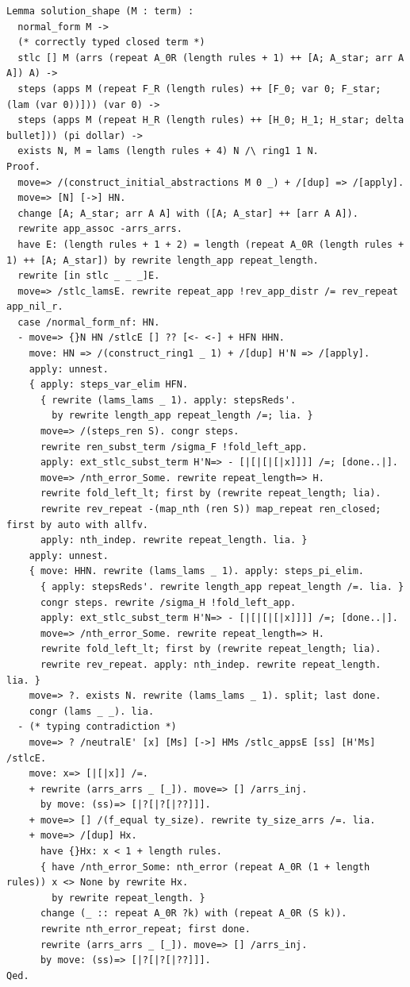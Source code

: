 \begin{lstlisting}
Lemma solution_shape (M : term) :
  normal_form M ->
  (* correctly typed closed term *)
  stlc [] M (arrs (repeat A_0R (length rules + 1) ++ [A; A_star; arr A A]) A) ->
  steps (apps M (repeat F_R (length rules) ++ [F_0; var 0; F_star; (lam (var 0))])) (var 0) ->
  steps (apps M (repeat H_R (length rules) ++ [H_0; H_1; H_star; delta bullet])) (pi dollar) ->
  exists N, M = lams (length rules + 4) N /\ ring1 1 N.
Proof.
  move=> /(construct_initial_abstractions M 0 _) + /[dup] => /[apply].
  move=> [N] [->] HN.
  change [A; A_star; arr A A] with ([A; A_star] ++ [arr A A]).
  rewrite app_assoc -arrs_arrs.
  have E: (length rules + 1 + 2) = length (repeat A_0R (length rules + 1) ++ [A; A_star]) by rewrite length_app repeat_length.
  rewrite [in stlc _ _ _]E.
  move=> /stlc_lamsE. rewrite repeat_app !rev_app_distr /= rev_repeat app_nil_r.
  case /normal_form_nf: HN.
  - move=> {}N HN /stlcE [] ?? [<- <-] + HFN HHN.
    move: HN => /(construct_ring1 _ 1) + /[dup] H'N => /[apply].
    apply: unnest.
    { apply: steps_var_elim HFN.
      { rewrite (lams_lams _ 1). apply: stepsReds'.
        by rewrite length_app repeat_length /=; lia. }
      move=> /(steps_ren S). congr steps.
      rewrite ren_subst_term /sigma_F !fold_left_app.
      apply: ext_stlc_subst_term H'N=> - [|[|[|[|x]]]] /=; [done..|].
      move=> /nth_error_Some. rewrite repeat_length=> H.
      rewrite fold_left_lt; first by (rewrite repeat_length; lia).
      rewrite rev_repeat -(map_nth (ren S)) map_repeat ren_closed; first by auto with allfv.
      apply: nth_indep. rewrite repeat_length. lia. }
    apply: unnest.
    { move: HHN. rewrite (lams_lams _ 1). apply: steps_pi_elim.
      { apply: stepsReds'. rewrite length_app repeat_length /=. lia. }
      congr steps. rewrite /sigma_H !fold_left_app.
      apply: ext_stlc_subst_term H'N=> - [|[|[|[|x]]]] /=; [done..|].
      move=> /nth_error_Some. rewrite repeat_length=> H.
      rewrite fold_left_lt; first by (rewrite repeat_length; lia).
      rewrite rev_repeat. apply: nth_indep. rewrite repeat_length. lia. }
    move=> ?. exists N. rewrite (lams_lams _ 1). split; last done.
    congr (lams _ _). lia.
  - (* typing contradiction *)
    move=> ? /neutralE' [x] [Ms] [->] HMs /stlc_appsE [ss] [H'Ms] /stlcE.
    move: x=> [|[|x]] /=.
    + rewrite (arrs_arrs _ [_]). move=> [] /arrs_inj.
      by move: (ss)=> [|?[|?[|??]]].
    + move=> [] /(f_equal ty_size). rewrite ty_size_arrs /=. lia.
    + move=> /[dup] Hx.
      have {}Hx: x < 1 + length rules.
      { have /nth_error_Some: nth_error (repeat A_0R (1 + length rules)) x <> None by rewrite Hx.
        by rewrite repeat_length. }
      change (_ :: repeat A_0R ?k) with (repeat A_0R (S k)).
      rewrite nth_error_repeat; first done.
      rewrite (arrs_arrs _ [_]). move=> [] /arrs_inj.
      by move: (ss)=> [|?[|?[|??]]].
Qed.


\end{lstlisting}
